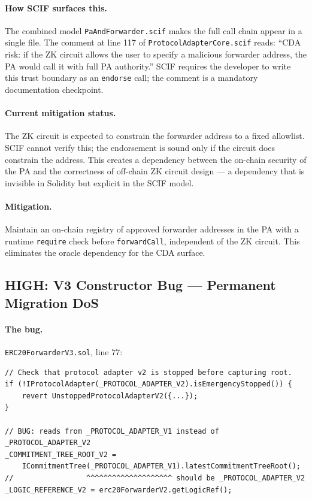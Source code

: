 \documentclass[11pt,a4paper]{article}
\newcommand{\fwdRepoRoot}{https://github.com/anoma/anomapay-erc20-forwarder/blob/main/contracts/src}
\newcommand{\fwdref}[3]{\href{\fwdRepoRoot/#1#2\#L#3}{\nolinkurl{#2:#3}}}
\begin{document}
\paragraph{How SCIF surfaces this.}
The combined model \texttt{PaAndForwarder.scif} makes the full call chain
appear in a single file. The comment at line 117 of \texttt{ProtocolAdapterCore.scif}
reads: ``CDA risk: if the ZK circuit allows the user to specify a malicious
forwarder address, the PA would call it with full PA authority.'' SCIF requires
the developer to write this trust boundary as an \texttt{endorse} call; the
comment is a mandatory documentation checkpoint.

\paragraph{Current mitigation status.}
The ZK circuit is expected to constrain the forwarder address to a fixed
allowlist. SCIF cannot verify this; the endorsement is sound only if the circuit
does constrain the address. This creates a dependency between the on-chain
security of the PA and the correctness of off-chain ZK circuit design --- a
dependency that is invisible in Solidity but explicit in the SCIF model.

\paragraph{Mitigation.} Maintain an on-chain registry of approved forwarder
addresses in the PA with a runtime \texttt{require} check before
\texttt{forwardCall}, independent of the ZK circuit. This eliminates the oracle
dependency for the CDA surface.

\subsection{HIGH: V3 Constructor Bug --- Permanent Migration DoS}
\label{sec:v3bug}

\paragraph{The bug.}
\texttt{ERC20ForwarderV3.sol}, line 77:

\begin{lstlisting}[style=soliditystyle,
  caption={The copy-paste error at \protect\fwdref{drafts/}{ERC20ForwarderV3.sol}{77}.},
  firstnumber=72]
// Check that protocol adapter v2 is stopped before capturing root.
if (!IProtocolAdapter(_PROTOCOL_ADAPTER_V2).isEmergencyStopped()) {
    revert UnstoppedProtocolAdapterV2({...});
}

// BUG: reads from _PROTOCOL_ADAPTER_V1 instead of _PROTOCOL_ADAPTER_V2
_COMMITMENT_TREE_ROOT_V2 =
    ICommitmentTree(_PROTOCOL_ADAPTER_V1).latestCommitmentTreeRoot();
//                 ^^^^^^^^^^^^^^^^^^^^ should be _PROTOCOL_ADAPTER_V2
_LOGIC_REFERENCE_V2 = erc20ForwarderV2.getLogicRef();
\end{lstlisting}
\end{document}
